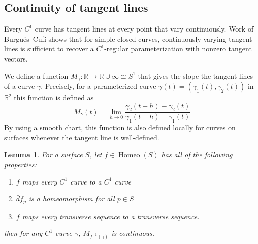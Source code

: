 \documentclass[sn-mathphys-num]{sn-jnl}%
\theoremstyle{thmstyleone}%
\newtheorem{lemma}{Lemma}[section]
\theoremstyle{thmstyletwo}%
\theoremstyle{thmstylethree}%
\DeclareMathOperator{\homeo}{Homeo}
\begin{document}
\subsection{Continuity of tangent lines}

Every $C^1$ curve has tangent lines at every point that vary continuously.  Work of Burgu\'es--Cuf\'i \cite[Theorem 10]{BC} shows that for simple closed curves,  continuously varying tangent lines is sufficient to recover a $C^1$-regular parameterization with nonzero tangent vectors.  

We define a function $M_{\gamma}: \mathbb{R} \rightarrow \mathbb{R} \cup \infty \cong S^1$ that gives the slope the tangent lines of a curve $\gamma$.  Precisely, for a parameterized curve $\gamma(t) = (\gamma_1(t), \gamma_2(t))$ in $\mathbb{R}^2$ this function is defined as
$$M_{\gamma}(t) = \lim_{h \rightarrow 0} \frac{\gamma_2(t+h) - \gamma_2(t)}{\gamma_1(t+h) - \gamma_1(t)}$$
By using a smooth chart, this function is also defined locally for curves on surfaces whenever the tangent line is well-defined.

\begin{lemma}\label{inversetangentcontinuous}
For a surface $S$, let $f \in \homeo(S)$ has all of the following properties:
\begin{enumerate}[noitemsep,topsep=0pt, label=$(\alph*)$]
\item $f$ maps every $C^1$ curve to a $C^1$ curve
\item $\bar{d}f_p$ is a homeomorphism for all $p \in S$
\item $f$ maps every transverse sequence to a transverse sequence.
\end{enumerate}
then for any $C^1$ curve $\gamma$,  $M_{f^{-1}(\gamma)}$ is continuous.
\end{lemma}
\end{document}
